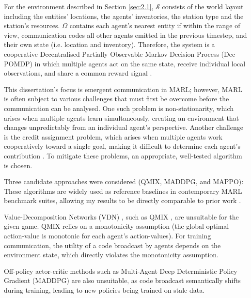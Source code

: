 For the environment described in Section \ref{sec:2.1}, $\mathcal{S}$ consists of the world layout including the entities' locations, the agents' inventories, the station type and the station's resources.
$\Omega$ contains each agent's nearest entity if within the range of view, communication codes all other agents emitted in the previous timestep, and their own state (i.e. location and inventory).
Therefore, the system is a cooperative Decentralised Partially Observable Markov Decision Process (Dec-POMDP) in which multiple agents act on the same state, receive individual local observations, and share a common reward signal \cite{dec-pomdp}.

This dissertation's focus is emergent communication in MARL; however, MARL is often subject to various challenges that must first be overcome before the communication can be analysed.
One such problem is non-stationarity, which arises when multiple agents learn simultaneously, creating an environment that changes unpredictably from an individual agent's perspective.
Another challenge is the credit assignment problem, which arises when multiple agents work cooperatively toward a single goal, making it difficult to determine each agent's contribution \cite{credit-assignment}.
To mitigate these problems, an appropriate, well-tested algorithm is chosen.

Three candidate approaches were considered (QMIX, MADDPG, and MAPPO):
These algorithms are widely used as reference baselines in contemporary MARL benchmark suites, allowing my results to be directly comparable to prior work \cite{benchmark-marl}.

Value-Decomposition Networks (VDN) \cite{VDN}, such as QMIX \cite{QMIX}, are unsuitable for the given game.
QMIX relies on a monotonicity assumption (the global optimal action-value is monotonic for each agent's action-values).
For training communication, the utility of a code broadcast by agents depends on the environment state, which directly violates the monotonicity assumption.

Off-policy actor-critic methods such as Multi-Agent Deep Deterministic Policy Gradient (MADDPG) \cite{MADDPG} are also unsuitable, as code broadcast semantically shifts during training, leading to new policies being trained on stale data.

